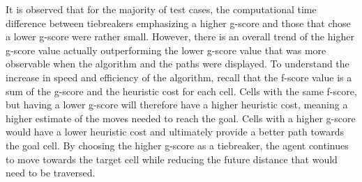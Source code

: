 \documentclass[12pt]{article}
\begin{document}
		It is observed that for the majority of test cases, the computational time difference between tiebreakers emphasizing a higher g-score and those that chose a lower g-score were rather small.  However, there is an overall trend of the higher g-score value actually outperforming the lower g-score value that was more observable when the algorithm and the paths were displayed.  To understand the increase in speed and efficiency of the algorithm, recall that the f-score value is a sum of the g-score and the heuristic cost for each cell.  Cells with the same f-score, but having a lower g-score will therefore have a higher heuristic cost, meaning a higher estimate of the moves needed to reach the goal.  Cells with a higher g-score would have a lower heuristic cost and ultimately provide a better path towards the goal cell.  By choosing the higher g-score as a tiebreaker, the agent continues to move towards the target cell while reducing the future distance that would need to be traversed.  
\end{document}
